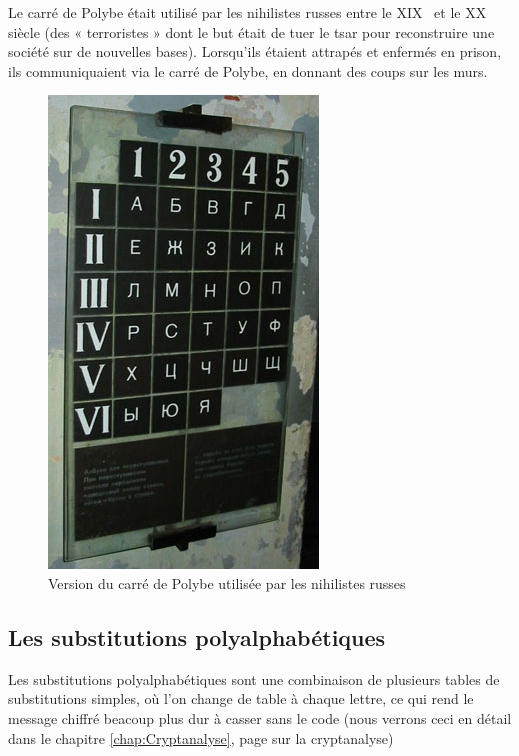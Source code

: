 Le carré de Polybe était utilisé par les nihilistes russes entre le
XIX\ieme~ et le XX\ieme~ siècle (des « terroristes » dont le but était de
tuer le tsar pour reconstruire une société sur de nouvelles
bases). Lorsqu'ils étaient attrapés et enfermés en prison, ils
communiquaient via le carré de Polybe, en donnant des coups sur les
murs. \\ %

\begin{figure}[h]
  \begin{center}
    \includegraphics[scale=1.5]{images/Nihilistes.jpg}
  \end{center}
  \caption{Version du carré de Polybe utilisée par les nihilistes
    russes}
  \label{fig:Nihilistes}
\end{figure}

\subsection{Les substitutions polyalphabétiques\label{SubstitutionPolyalphabetique}}
Les substitutions polyalphabétiques sont une combinaison de plusieurs
tables de substitutions simples, où l'on change de table à chaque
lettre, ce qui rend le message chiffré beacoup plus dur à casser sans
le code (nous verrons ceci en détail dans le chapitre
\ref{chap:Cryptanalyse}, page \pageref{chap:Cryptanalyse} sur la cryptanalyse)

